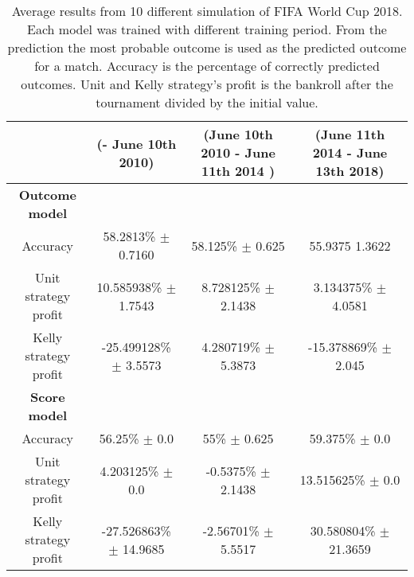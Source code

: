 \begin{sidewaystable}
    \caption{Average results from 10 different simulation of FIFA World Cup 2018. Each model was trained with different training period. From the prediction the most probable outcome is used as the predicted outcome for a match. Accuracy is the percentage of correctly predicted outcomes. Unit and Kelly strategy's profit is the bankroll after the tournament divided by the initial value.}
    \begin{tabular}{ | c |c| c | c |}
    \hline
    & (- June 10th 2010) & (June 10th 2010 - June 11th 2014 ) & (June 11th 2014 - June 13th 2018) \\
    \hline
    \textbf{Outcome model} \\
    \hline
    Accuracy & 58.2813\% $\pm$ 0.7160 & 58.125\% $\pm$ 0.625 & 55.9375 1.3622 \\
    Unit strategy profit& 10.585938\% $\pm$ 1.7543 & 8.728125\% $\pm$ 2.1438 & 3.134375\% $\pm$ 4.0581 \\
    Kelly strategy profit& -25.499128\% $\pm$ 3.5573 & 4.280719\% $\pm$ 5.3873 & -15.378869\% $\pm$ 2.045 \\
    \hline
    \textbf{Score model} \\
    \hline
    Accuracy & 56.25\% $\pm$ 0.0 & 55\% $\pm$ 0.625 & 59.375\% $\pm$ 0.0 \\
    Unit strategy profit& 4.203125\% $\pm$ 0.0 & -0.5375\% $\pm$ 2.1438 & 13.515625\% $\pm$ 0.0 \\
    Kelly strategy profit& -27.526863\% $\pm$ 14.9685 & -2.56701\% $\pm$ 5.5517 & 30.580804\% $\pm$ 21.3659 \\
    \hline
   \end{tabular}
\end{sidewaystable}

